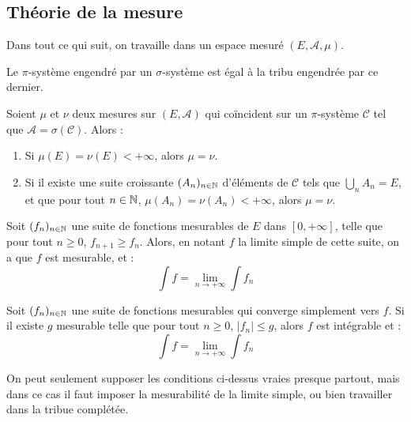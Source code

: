 \documentclass[11pt,a4paper]{article}
\begin{document}
\newpage
\begin{center}
\section{Théorie de la mesure} 
\end{center}
Dans tout ce qui suit, on travaille dans un espace mesuré $(E,\mathcal{A},\mu)$.\\ 

\begin{thm}[Dynkin] Le $\pi$-système engendré par un $\sigma$-système est égal à la tribu engendrée par ce dernier.
\end{thm}

\begin{cor} Soient $\mu$ et $\nu$ deux mesures sur $(E,\mathcal{A})$ qui coïncident sur un $\pi$-système $\mathcal{C}$ tel que $\mathcal{A}=\sigma(\mathcal{C})$. Alors :
\begin{enumerate}
\item Si $\mu(E)=\nu(E) < +\infty$, alors $\mu = \nu$.
\item Si il existe une suite croissante $(A_n)_{n\in\mathbb N}$ d'éléments de $\mathcal{C}$ tels que $\displaystyle \bigcup_n A_n = E$, et que pour tout $n\in\mathbb N$, $\mu(A_n)=\nu(A_n)<+\infty$, alors $\mu = \nu$.
\end{enumerate}
\end{cor}

\begin{thm}
Soit $(f_n)_{n\in\mathbb N}$ une suite de fonctions mesurables de $E$ dans $[0,+\infty]$, telle que pour tout $n\geq 0$, $f_{n+1} \geq f_n$. Alors, en notant $f$ la limite simple de cette suite, on a que $f$ est mesurable, et : 
\[\int f = \lim\limits_{n \to +\infty} \int f_n \]
\end{thm}

\begin{thm}
Soit $(f_n)_{n\in\mathbb N}$ une suite de fonctions mesurables qui converge simplement vers $f$. Si il existe $g$ mesurable telle que pour tout $n \geq 0$, $\left| f_n \right| \leq g$, alors $f$ est intégrable et :
\[\int f = \lim\limits_{n \to +\infty} \int f_n \]

\end{thm}

\begin{rmq}
On peut seulement supposer les conditions ci-dessus vraies presque partout, mais dans ce cas il faut imposer la mesurabilité de la limite simple, ou bien travailler dans la tribue complétée.
\end{rmq}
\end{document}
